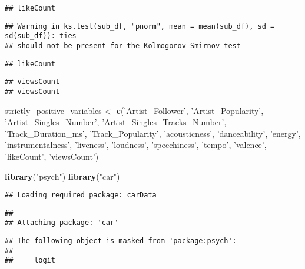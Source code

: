 \documentclass[
]{article}
\newenvironment{Shaded}{\begin{snugshade}}{\end{snugshade}}
\newcommand{\KeywordTok}[1]{\textcolor[rgb]{0.13,0.29,0.53}{\textbf{#1}}}
\newcommand{\NormalTok}[1]{#1}
\newcommand{\StringTok}[1]{\textcolor[rgb]{0.31,0.60,0.02}{#1}}
\begin{document}
\begin{verbatim}
## likeCount
\end{verbatim}

\begin{verbatim}
## Warning in ks.test(sub_df, "pnorm", mean = mean(sub_df), sd = sd(sub_df)): ties
## should not be present for the Kolmogorov-Smirnov test
\end{verbatim}

\begin{verbatim}
## likeCount
\end{verbatim}

\begin{verbatim}
## viewsCount
## viewsCount
\end{verbatim}

\begin{Shaded}
\begin{Highlighting}[]
\NormalTok{strictly_positive_variables <-}\StringTok{ }\KeywordTok{c}\NormalTok{(}\StringTok{'Artist_Follower'}\NormalTok{, }\StringTok{'Artist_Popularity'}\NormalTok{, }\StringTok{'Artist_Singles_Number'}\NormalTok{, }\StringTok{'Artist_Singles_Tracks_Number'}\NormalTok{, }\StringTok{'Track_Duration_ms'}\NormalTok{, }\StringTok{'Track_Popularity'}\NormalTok{, }\StringTok{'acousticness'}\NormalTok{, }\StringTok{'danceability'}\NormalTok{, }\StringTok{'energy'}\NormalTok{, }\StringTok{'instrumentalness'}\NormalTok{, }\StringTok{'liveness'}\NormalTok{, }\StringTok{'loudness'}\NormalTok{, }\StringTok{'speechiness'}\NormalTok{, }\StringTok{'tempo'}\NormalTok{, }\StringTok{'valence'}\NormalTok{, }\StringTok{'likeCount'}\NormalTok{, }\StringTok{'viewsCount'}\NormalTok{)}

\KeywordTok{library}\NormalTok{(}\StringTok{"psych"}\NormalTok{)}
\KeywordTok{library}\NormalTok{(}\StringTok{"car"}\NormalTok{)}
\end{Highlighting}
\end{Shaded}

\begin{verbatim}
## Loading required package: carData
\end{verbatim}

\begin{verbatim}
## 
## Attaching package: 'car'
\end{verbatim}

\begin{verbatim}
## The following object is masked from 'package:psych':
## 
##     logit
\end{verbatim}
\end{document}
